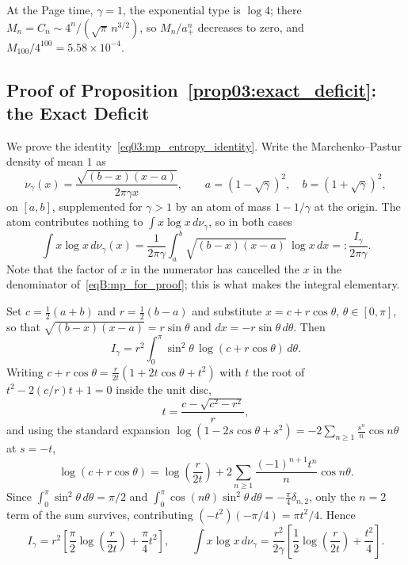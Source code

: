 \documentclass[11pt,letterpaper]{article}
\theoremstyle{plain}
\theoremstyle{definition}
\theoremstyle{remark}
\begin{document}
At the Page time, $\gamma = 1$, the exponential type is $\log 4$; there
 $M_n = C_n \sim 4^n/(\sqrt{\pi}\,n^{3/2})$, so $M_n/a_+^n$ decreases to zero, and $M_{100}/4^{100} = 5.58 \times 10^{-4}$.

\subsection{Proof of Proposition~\ref{prop03:exact_deficit}: the Exact Deficit}
\label{subsecB:exact_deficit}

We prove the identity~\eqref{eq03:mp_entropy_identity}. Write the Marchenko--Pastur density of mean $1$ as
\begin{equation}
\label{eqB:mp_for_proof}
\nu_\gamma(x) = \frac{\sqrt{(b-x)(x-a)}}{2\pi\gamma x}, \qquad a = (1-\sqrt{\gamma})^2, \quad b = (1+\sqrt{\gamma})^2,
\end{equation}
on $[a,b]$, supplemented for $\gamma > 1$ by an atom of mass $1 - 1/\gamma$ at the origin. The atom contributes nothing to $\int x \log x \, d\nu_\gamma$, so in both cases
\begin{equation}
\label{eqB:J_definition}
\int x \log x \, d\nu_\gamma(x) = \frac{1}{2\pi\gamma} \int_a^b \sqrt{(b-x)(x-a)} \, \log x \, dx =: \frac{I_\gamma}{2\pi\gamma}.
\end{equation}
Note that the factor of $x$ in the numerator has cancelled the $x$ in the denominator of~\eqref{eqB:mp_for_proof}; this is what makes the integral elementary.

Set $c = \tfrac{1}{2}(a+b)$ and $r = \tfrac{1}{2}(b-a)$ and substitute $x = c + r\cos\theta$, $\theta \in [0,\pi]$, so that $\sqrt{(b-x)(x-a)} = r\sin\theta$ and $dx = -r\sin\theta \, d\theta$. Then
\begin{equation}
\label{eqB:J_angular}
I_\gamma = r^2 \int_0^\pi \sin^2\theta \, \log(c + r\cos\theta) \, d\theta .
\end{equation}
Writing $c + r\cos\theta = \frac{r}{2t}\left(1 + 2t\cos\theta + t^2\right)$ with $t$ the root of $t^2 - 2(c/r)t + 1 = 0$ inside the unit disc,
\begin{equation}
\label{eqB:t_root}
t = \frac{c - \sqrt{c^2-r^2}}{r},
\end{equation}
and using the standard expansion $\log(1 - 2s\cos\theta + s^2) = -2\sum_{n\ge1} \frac{s^n}{n}\cos n\theta$ at $s = -t$,
\begin{equation}
\label{eqB:log_fourier}
\log(c + r\cos\theta) = \log\!\left(\frac{r}{2t}\right) + 2\sum_{n\ge1} \frac{(-1)^{n+1} t^n}{n} \cos n\theta .
\end{equation}
Since $\int_0^\pi \sin^2\theta \, d\theta = \pi/2$ and $\int_0^\pi \cos(n\theta)\sin^2\theta \, d\theta = -\tfrac{\pi}{4}\delta_{n,2}$, only the $n=2$ term of the sum survives, contributing $(-t^2)(-\pi/4) = \pi t^2/4$. Hence
\begin{equation}
\label{eqB:J_evaluated}
I_\gamma = r^2\left[\frac{\pi}{2}\log\!\left(\frac{r}{2t}\right) + \frac{\pi}{4}t^2\right],
\qquad
\int x \log x \, d\nu_\gamma = \frac{r^2}{2\gamma}\left[\frac{1}{2}\log\!\left(\frac{r}{2t}\right) + \frac{t^2}{4}\right].
\end{equation}
\end{document}
